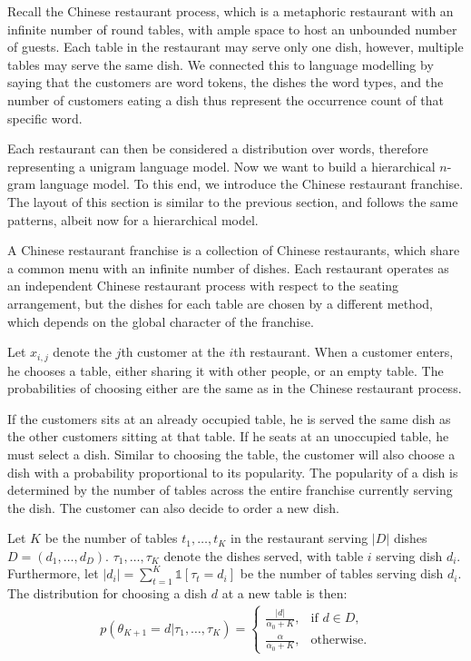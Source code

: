Recall the Chinese restaurant process, which is a metaphoric restaurant with an infinite number of round tables, with ample space to host an unbounded number of guests. Each table in the restaurant may serve only one dish, however, multiple tables may serve the same dish. We connected this to language modelling by saying that the customers are word tokens, the dishes the word types, and the number of customers eating a dish thus represent the occurrence count of that specific word.

Each restaurant can then be considered a distribution over words, therefore representing a unigram language model. Now we want to build a hierarchical $n$-gram language model. To this end, we introduce the Chinese restaurant franchise. The layout of this section is similar to the previous section, and follows the same patterns, albeit now for a hierarchical model.

A Chinese restaurant franchise is a collection of Chinese restaurants, which share a common menu with an infinite number of dishes. Each restaurant operates as an independent Chinese restaurant process with respect to the seating arrangement, but the dishes for each table are chosen by a different method, which depends on the global character of the franchise. 

Let $x_{i,j}$ denote the $j$th customer at the $i$th restaurant. When a customer enters, he chooses a table, either sharing it with other people, or an empty table. The probabilities of choosing either are the same as in the Chinese restaurant process.

If the customers sits at an already occupied table, he is served the same dish as the other customers sitting at that table. If he seats at an unoccupied table, he must select a dish. Similar to choosing the table, the customer will also choose a dish with a probability proportional to its popularity. The popularity of a dish is determined by the number of tables across the entire franchise currently serving the dish. The customer can also decide to order a new dish.

Let $K$ be the number of tables $t_1,\ldots,t_K$ in the restaurant serving $|D|$ dishes $D = (d_1,\ldots,d_D)$. $\tau_1,\ldots,\tau_K$ denote the dishes served, with table $i$ serving dish $d_i$. Furthermore, let $|d_i| = \sum_{t=1}^K \mathbb{1}[\tau_t = d_i]$ be the number of tables serving dish $d_i$. The distribution for choosing a dish $d$ at a new table is then:
\begin{align}
	p(\theta_{K+1}=d | \tau_1, \ldots, \tau_K) = 
    	\begin{cases}
        	\frac{|d|}{\alpha_0+K}, & \text{if }d\in D,\\
            \frac{\alpha}{\alpha_0+K}, & \text{otherwise.}
        \end{cases}
\end{align}


